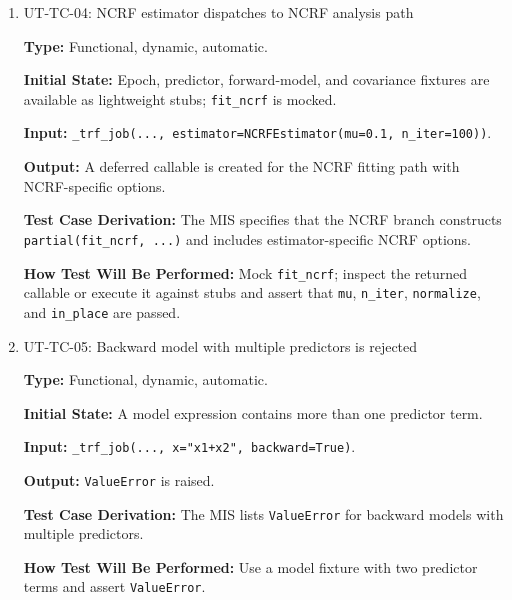 \documentclass[12pt, titlepage]{article}
\begin{document}
\begin{enumerate}
\textbf{Output:} A deferred callable is created for the boosting fitting path with boosting-specific options.

\textbf{Test Case Derivation:} The MIS specifies that one branch of \texttt{\_trf\_job} constructs \texttt{partial(boosting, ...)}.

\textbf{How Test Will Be Performed:} Mock \texttt{boosting}; inspect the returned \texttt{partial} or execute it against a mock and assert that boosting arguments such as \texttt{basis} and \texttt{partitions} are passed.

\item{UT-TC-04: NCRF estimator dispatches to NCRF analysis path\\}

\textbf{Type:} Functional, dynamic, automatic.

\textbf{Initial State:} Epoch, predictor, forward-model, and covariance fixtures are available as lightweight stubs; \texttt{fit\_ncrf} is mocked.

\textbf{Input:} \texttt{\_trf\_job(..., estimator=NCRFEstimator(mu=0.1, n\_iter=100))}.

\textbf{Output:} A deferred callable is created for the NCRF fitting path with NCRF-specific options.

\textbf{Test Case Derivation:} The MIS specifies that the NCRF branch constructs \texttt{partial(fit\_ncrf, ...)} and includes estimator-specific NCRF options.

\textbf{How Test Will Be Performed:} Mock \texttt{fit\_ncrf}; inspect the returned callable or execute it against stubs and assert that \texttt{mu}, \texttt{n\_iter}, \texttt{normalize}, and \texttt{in\_place} are passed.

\item{UT-TC-05: Backward model with multiple predictors is rejected\\}

\textbf{Type:} Functional, dynamic, automatic.

\textbf{Initial State:} A model expression contains more than one predictor term.

\textbf{Input:} \texttt{\_trf\_job(..., x="x1+x2", backward=True)}.

\textbf{Output:} \texttt{ValueError} is raised.

\textbf{Test Case Derivation:} The MIS lists \texttt{ValueError} for backward models with multiple predictors.

\textbf{How Test Will Be Performed:} Use a model fixture with two predictor terms and assert \texttt{ValueError}.

\end{enumerate}
\end{document}
